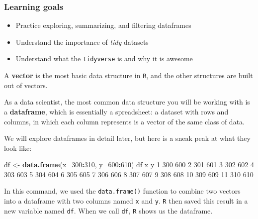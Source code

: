 \documentclass[
]{book}
\newenvironment{Shaded}{\begin{snugshade}}{\end{snugshade}}
\newcommand{\DataTypeTok}[1]{\textcolor[rgb]{0.13,0.29,0.53}{#1}}
\newcommand{\DecValTok}[1]{\textcolor[rgb]{0.00,0.00,0.81}{#1}}
\newcommand{\KeywordTok}[1]{\textcolor[rgb]{0.13,0.29,0.53}{\textbf{#1}}}
\newcommand{\NormalTok}[1]{#1}
\newcommand{\OperatorTok}[1]{\textcolor[rgb]{0.81,0.36,0.00}{\textbf{#1}}}
\newcommand{\StringTok}[1]{\textcolor[rgb]{0.31,0.60,0.02}{#1}}
\providecommand{\tightlist}{%
  \setlength{\itemsep}{0pt}\setlength{\parskip}{0pt}}
\begin{document}
\hypertarget{learning-goals-10}{%
\subsubsection*{Learning goals}\label{learning-goals-10}}

\begin{itemize}
\tightlist
\item
  Practice exploring, summarizing, and filtering dataframes
\item
  Understand the importance of \emph{tidy} datasets
\item
  Understand what the \texttt{tidyverse} is and why it is awesome
\end{itemize}

A \textbf{vector} is the most basic data structure in \texttt{R}, and the other structures are built out of vectors.

As a data scientist, the most common data structure you will be working with is a \textbf{dataframe}, which is essentially a spreadsheet: a dataset with rows and columns, in which each column represents is a vector of the same class of data.

We will explore dataframes in detail later, but here is a sneak peak at what they look like:

\begin{Shaded}
\begin{Highlighting}[]
\NormalTok{df <-}\StringTok{ }\KeywordTok{data.frame}\NormalTok{(}\DataTypeTok{x=}\DecValTok{300}\OperatorTok{:}\DecValTok{310}\NormalTok{,}
           \DataTypeTok{y=}\DecValTok{600}\OperatorTok{:}\DecValTok{610}\NormalTok{)}
\NormalTok{df}
\NormalTok{     x   y}
\DecValTok{1}  \DecValTok{300} \DecValTok{600}
\DecValTok{2}  \DecValTok{301} \DecValTok{601}
\DecValTok{3}  \DecValTok{302} \DecValTok{602}
\DecValTok{4}  \DecValTok{303} \DecValTok{603}
\DecValTok{5}  \DecValTok{304} \DecValTok{604}
\DecValTok{6}  \DecValTok{305} \DecValTok{605}
\DecValTok{7}  \DecValTok{306} \DecValTok{606}
\DecValTok{8}  \DecValTok{307} \DecValTok{607}
\DecValTok{9}  \DecValTok{308} \DecValTok{608}
\DecValTok{10} \DecValTok{309} \DecValTok{609}
\DecValTok{11} \DecValTok{310} \DecValTok{610}
\end{Highlighting}
\end{Shaded}

In this command, we used the \texttt{data.frame()} function to combine two vectors into a dataframe with two columns named \texttt{x} and \texttt{y}. \texttt{R} then saved this result in a new variable named \texttt{df}. When we call \texttt{df}, \texttt{R} shows us the dataframe.
\end{document}
